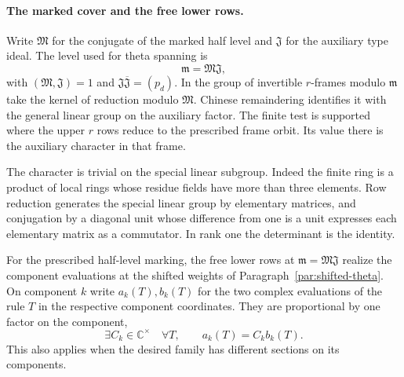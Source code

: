 \paragraph{The marked cover and the free lower rows.}
Write \(\mathfrak M\) for the conjugate of the marked half level
and \(\mathfrak J\) for the auxiliary type ideal. The level used
for theta spanning is 
\[
  \mathfrak m=\mathfrak M\mathfrak J,
\]
 with
\((\mathfrak M,\mathfrak J)=1\) and
\(\mathfrak J\overline{\mathfrak J}=(p_d)\).
In the group of invertible \(r\)-frames modulo \(\mathfrak m\)
take the kernel of reduction modulo \(\mathfrak M\). Chinese
remaindering identifies it with the general linear group on the
auxiliary factor. The finite test is supported where the upper
\(r\) rows reduce to the prescribed frame orbit. Its value there
is the auxiliary character in that frame.

The character is
trivial on the special linear subgroup. Indeed the finite ring
is a product of local rings whose residue fields have more than
three elements. Row reduction generates the special linear group
by elementary matrices, and conjugation by a diagonal unit whose
difference from one is a unit expresses each elementary matrix
as a commutator. In rank one the determinant is the identity.

\begin{proposition}
\label{prop:marked-theta-family}
For the prescribed half-level marking, the free lower rows at
\(\mathfrak m=\mathfrak M\mathfrak J\) realize the component evaluations at the shifted weights of Paragraph~\ref{par:shifted-theta}.
On component \(k\) write \(a_k(T),b_k(T)\) for the two complex evaluations of the rule \(T\) in the respective component coordinates. They are proportional by one factor on the component,
\[
 \exists C_k\in\mathbb C^\times\quad\forall T,\qquad a_k(T)=C_k b_k(T).
\]
This also applies when the desired family has different sections on its components.
\end{proposition}


